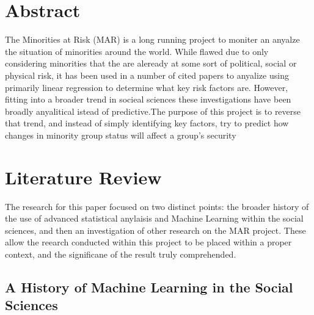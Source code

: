 \documentclass[12pt]{article}
\begin{document}

\newcommand{\hmwkClass}{CS 280}
\newcommand{\hmwkSemester}{Fall 2016}

\newcommand{\hmwkAuthorName}{Brendan Burgess}
\newcommand{\hmwkAuthorID}{brburgess}

\newcommand{\hmwkAssignmentNum}{4}

\newcommand{\hmwkProblemNum}{1}




\noindent

\section{Abstract}
The Minorities at Risk (MAR) is a long running project to moniter an anyalze the situation of minorities around the world. While flawed due to only considering minorities that the are aleready at some sort of political, social or physical risk, it has been used in a number of cited papers to anyalize using primarily linear regression to determine what key risk factors are. However, fitting into a broader trend in socieal sciences these investigations have been broadly anyalitical istead of predictive.The purpose of this project is to reverse that trend, and instead of simply identifying key factors, try to predict how changes in minority group status will affect a group's security

\section{Literature Review}

The research for this paper focused on two distinct points: the broader history of the use of advanced statistical anylaisis and Machine Learning within the social sciences, and then an investigation of other research on the MAR project. These allow the reearch conducted within this project to be placed within a proper context, and the significane of the result truly comprehended. 

\subsection{A History of Machine Learning in the Social Sciences}
\end{document}
